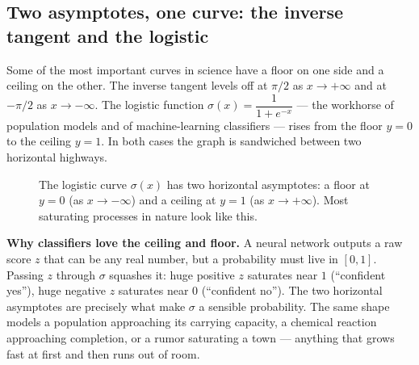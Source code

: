 \subsection{Two asymptotes, one curve: the inverse tangent and the logistic}

Some of the most important curves in science have a floor on one side and a
ceiling on the other. The inverse tangent levels off at $\pi/2$ as $x\to+\infty$
and at $-\pi/2$ as $x\to-\infty$. The logistic function
$\sigma(x) = \dfrac{1}{1+e^{-x}}$ --- the workhorse of population models and of
machine-learning classifiers --- rises from the floor $y=0$ to the ceiling
$y=1$. In both cases the graph is sandwiched between two horizontal highways.

\begin{figure}[H]
\centering
{}
\caption{The logistic curve $\sigma(x)$ has two horizontal asymptotes: a floor
at $y=0$ (as $x\to-\infty$) and a ceiling at $y=1$ (as $x\to+\infty$). Most
saturating processes in nature look like this.}
\label{ch09:fig-logistic}
\end{figure}

\begin{applicationbox}
\textbf{Why classifiers love the ceiling and floor.} A neural network outputs a
raw score $z$ that can be any real number, but a probability must live in
$[0,1]$. Passing $z$ through $\sigma$ squashes it: huge positive $z$ saturates
near $1$ (``confident yes''), huge negative $z$ saturates near $0$ (``confident
no''). The two horizontal asymptotes are precisely what make $\sigma$ a sensible
probability. The same shape models a population approaching its carrying
capacity, a chemical reaction approaching completion, or a rumor saturating a
town --- anything that grows fast at first and then runs out of room.
\end{applicationbox}

